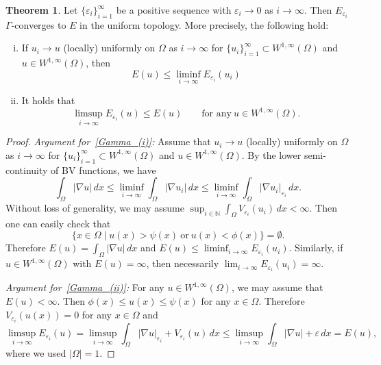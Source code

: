 \documentclass{amsart}
\theoremstyle{definition}
\newtheorem{theorem}[definition]{Theorem}
\begin{document}
\begin{theorem}\label{thm1.3}
Let $\{ \varepsilon _i \} _{i=1} ^\infty$ be a positive sequence with $\varepsilon _i \to 0$ as $i\to \infty$. Then
$E_{\varepsilon_i}$ $\Gamma$-converges to $E$ in the uniform topology.  
More precisely, the following hold:
\begin{enumerate}[(i)]
    \item \label{Gamma_(i)}  If 
    $u_{i} \to u $ (locally) uniformly on $ \Omega $ 
    as $ i\to \infty$ for
    $\{ u_{i} \}_{i=1} ^\infty \subset W^{1,\infty} (\Omega)$ and $u \in W^{1,\infty} (\Omega)$, then
    \[
    E(u) \leq \liminf_{i\to \infty} E_{\varepsilon_i} (u_i)
    \]
    \item \label{Gamma_(ii)} It holds that
    \[
    \limsup_{i \to \infty} E_{\varepsilon_i} (u)
    \leq E (u) \qquad \text{for any} \ u \in 
    W^{1,\infty}  (\Omega).
    \]
\end{enumerate}
\end{theorem}
\begin{proof}
    \emph{Argument for~\eqref{Gamma_(i)}:}  Assume that $u_{i} \to u $ (locally) uniformly on $ \Omega $ 
    as $ i\to \infty$ for
    $\{ u_{i} \}_{i=1} ^\infty \subset W^{1,\infty} (\Omega)$ and $u \in W^{1,\infty} (\Omega)$.
    By the lower semi-continuity of BV functions, we have
    \[
    \int _{\Omega} |\nabla u| \, dx \leq 
    \liminf_{i\to \infty} \int_{\Omega} |\nabla u_i| \, dx 
    \leq 
    \liminf_{i\to \infty} \int_{\Omega} |\nabla u_i|_{\varepsilon _i} \, dx.
    \]    
    Without loss of generality, we may assume $\sup_{i \in \mathbb{N}} \int_{\Omega} V_{\varepsilon_i} (u_i) \, dx <\infty$. Then
    one can easily check that
    \[
    \{ x \in \Omega \mid u(x) > \psi (x) \ \text{or} \ u(x) < \phi (x) \}=\emptyset.
    \]
    Therefore $E (u) =\int_{\Omega} |\nabla u| \, dx$ and
    $E(u) \leq \liminf_{i\to \infty} E_{\varepsilon_i} (u_i)$.
    Similarly, if $u\in W^{1,\infty}(\Omega)$ with $E(u)=\infty$, then necessarily $\lim_{i\to \infty} E_{\varepsilon_i} (u_i)= \infty$.
    
    \smallskip
	
	\emph{Argument for~\eqref{Gamma_(ii)}:} For any $u \in W^{1,\infty} (\Omega)$,
    we may assume that $E(u) <\infty$.
    Then $\phi (x) \leq u (x) \leq \psi (x)$ for any $x \in \Omega$. Therefore $V_{\varepsilon_i} (u (x))=0$ for any $x \in \Omega$ and
    \[
    \limsup_{i\to\infty} E_{\varepsilon_i} (u)
    =
    \limsup_{i\to\infty}
    \int_\Omega |\nabla u|_{\varepsilon_i} + V_{\varepsilon_i} (u) \, dx
    \leq
    \limsup_{i\to\infty}
    \int_\Omega |\nabla u| + \varepsilon \, dx
    =E(u),
    \]
    where we used $|\Omega|=1$.
\end{proof}
\end{document}
